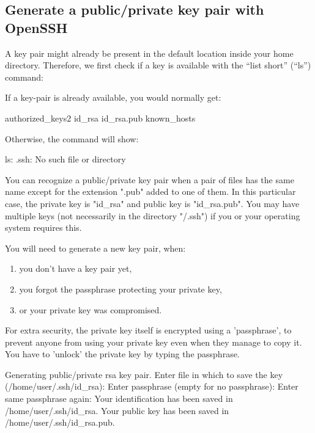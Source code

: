   \subsection{Generate a public/private key pair with OpenSSH}
  \label{sec:generate-key-pair-with-openssh}

  A key pair might already be present in the default location inside your home
  directory. Therefore, we first check if a key is available with the ``list
  short'' (``ls'')  command:

\begin{prompt}
\end{prompt}


  If a key-pair is already available, you would normally get:
\begin{prompt}
authorized_keys2    id_rsa            id_rsa.pub         known_hosts
\end{prompt}

  Otherwise, the command will show:

\begin{prompt}
ls: .ssh: No such file or directory
\end{prompt}

  You can recognize a public/private key pair when a pair of files has the same
  name except for the extension ".pub" added to one of them. In this particular
  case, the private key is "id\_rsa" and public key is "id\_rsa.pub". You may
  have multiple keys (not necessarily in the directory "\tilde/.ssh") if you or
  your operating system requires this.

  You will need to generate a new key pair, when:
  \begin{enumerate}
    \item  you don't have a key pair yet,
    \item  you forgot the passphrase protecting your private key,
    \item  or your private key was compromised.
  \end{enumerate}

  For extra security, the private key itself is encrypted using a 'passphrase',
  to prevent anyone from using your private key even when they manage to copy
  it. You have to 'unlock' the private key by typing the passphrase.

\begin{prompt}
Generating public/private rsa key pair.
Enter file in which to save the key (/home/user/.ssh/id_rsa):
Enter passphrase (empty for no passphrase):
Enter same passphrase again:
Your identification has been saved in /home/user/.ssh/id_rsa.
Your public key has been saved in /home/user/.ssh/id_rsa.pub.
\end{prompt}

